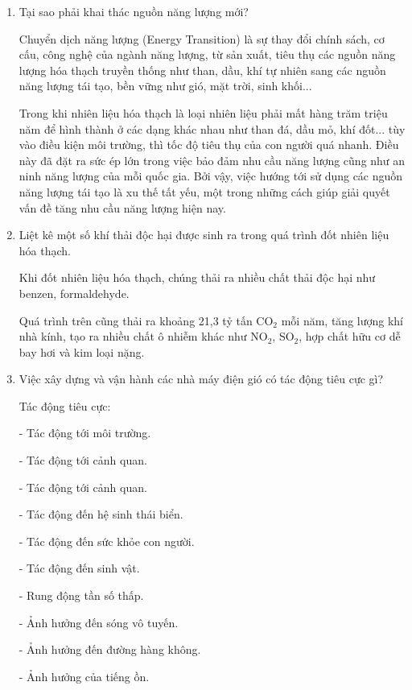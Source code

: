 \begin{enumerate}[label=\bfseries Câu \arabic*:]
{		
		
	}
	\item {}
	
	
	{
		Tại sao phải khai thác nguồn năng lượng mới?
	}
	
	\hideall
	{
		Chuyển dịch năng lượng (Energy Transition) là sự thay đổi chính sách, cơ cấu, công nghệ của ngành năng lượng, từ sản xuất, tiêu thụ các nguồn năng lượng hóa thạch truyền thống như than, dầu, khí tự nhiên sang các nguồn năng lượng tái tạo, bền vững như gió, mặt trời, sinh khối...
		
		Trong khi nhiên liệu hóa thạch là loại nhiên liệu phải mất hàng trăm triệu năm để hình thành ở các dạng khác nhau như than đá, dầu mỏ, khí đốt... tùy vào điều kiện môi trường, thì tốc độ tiêu thụ của con người quá nhanh. Điều này đã đặt ra sức ép lớn trong việc bảo đảm nhu cầu năng lượng cũng như an ninh năng lượng của mỗi quốc gia. Bởi vậy, việc hướng tới sử dụng các nguồn năng lượng tái tạo là xu thế tất yếu, một trong những cách giúp giải quyết vấn đề tăng nhu cầu năng lượng hiện nay.
	}
	\item {}
	
	
	{
		Liệt kê một số khí thải độc hại được sinh ra trong quá trình đốt nhiên liệu hóa thạch.
	}
	
	\hideall
	{
		Khi đốt nhiên liệu hóa thạch, chúng thải ra nhiều chất thải độc hại như benzen, formaldehyde.
		
		Quá trình trên cũng thải ra khoảng 21,3 tỷ tấn CO$_2$ mỗi năm, tăng lượng khí nhà kính, tạo ra nhiều chất ô nhiễm khác như NO$_2$, SO$_2$, hợp chất hữu cơ dễ bay hơi và kim loại nặng.
	}
	\item {}
	
	
	{
		Việc xây dựng và vận hành các nhà máy điện gió có tác động tiêu cực gì?
	}
	
	\hideall
	{
		Tác động tiêu cực:
		
		- Tác động tới môi trường.
		
		- Tác động tới cảnh quan.
		
		- Tác động tới cảnh quan.
		
		- Tác động đến hệ sinh thái biển.
		
		- Tác động đến sức khỏe con người.
		
		- Tác động đến sinh vật.
		
		- Rung động tần số thấp.
		
		- Ảnh hưởng đến sóng vô tuyến.
		
		- Ảnh hưởng đến đường hàng không.
		
		- Ảnh hưởng của tiếng ồn.
	}
\end{enumerate}